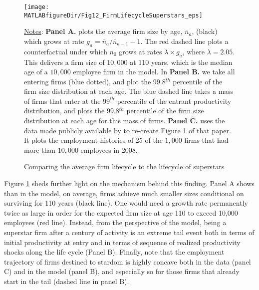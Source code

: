 \begin{figure}[ttt]
\begin{center}
\hspace*{-0.5cm}\texttt{[image: \\MATLABfigureDir/Fig12\_FirmLifecycleSuperstars\_eps]}
\caption{Comparing the average firm lifecycle to the lifecycle of superstars}\label{figure:Luttmer}\vspace*{-0.1cm}
\end{center}
\footnotesize{\underline{Notes}:
\textbf{Panel A.} plots the average firm size by age, $\overline{n}_a$, (black) which grows at rate $g_a = \overline{n}_{a}/\overline{n}_{a-1}-1$.
The red dashed line plots a counterfactual under which $n_0$ grows at rates $\lambda\times g_a$, where $\lambda=2.05$.
This delivers a firm size of $10,000$ at 110 years, which is the median age of a $10,000$ employee firm in the model.
In \textbf{Panel B.} we take all entering firms (blue dotted), and plot the 99.8$^{th}$ percentile of the firm size distribution at each age.
The blue dashed line takes a mass of firms that enter at the $99^{th}$ percentile of the entrant productivity distribution, and plots the 99.8$^{th}$ percentile of the firm size distribution at each age for this mass of firms.
\textbf{Panel C.} uses the data made publicly available by \cite{luttmer2011} to re-create Figure 1 of that paper.
It plots the employment histories of 25 of the $1,000$ firms that had more than $10,000$ employees in 2008.
}
\end{figure}

Figure \ref{figure:Luttmer} sheds further light on the mechanism behind this finding. Panel A shows than in the model, on average, firms achieve much smaller sizes conditional on surviving for 110 years (black line). One would need a growth rate permanently twice as large in order for the expected firm size at age 110 to exceed 10,000 employees (red line). Instead, from the perspective of the model, being a superstar firm after a century of activity is an extreme tail event both in terms of initial productivity at entry and in terms of sequence of realized productivity shocks along the life cycle (Panel B). Finally, note that the employment trajectory of firms destined to stardom is highly concave both in the data (panel C) and in the model (panel B), and especially so for those firms that already start in the tail (dashed line in panel B).

